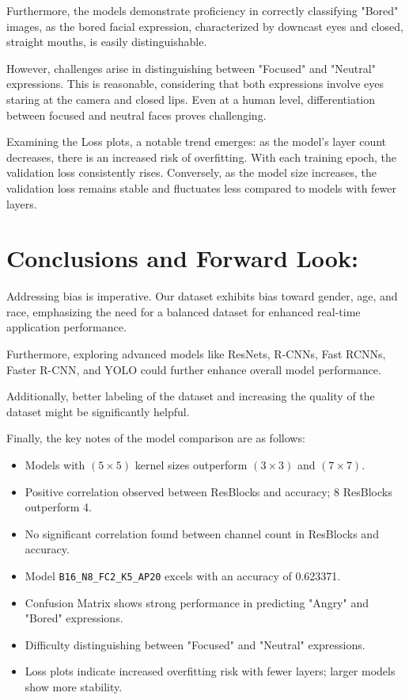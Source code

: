 Furthermore, the models demonstrate proficiency in correctly classifying "Bored" images, as the bored facial expression, characterized by downcast eyes and closed, straight mouths, is easily distinguishable.

However, challenges arise in distinguishing between "Focused" and "Neutral" expressions. This is reasonable, considering that both expressions involve eyes staring at the camera and closed lips. Even at a human level, differentiation between focused and neutral faces proves challenging.

Examining the Loss plots, a notable trend emerges: as the model's layer count decreases, there is an increased risk of overfitting. With each training epoch, the validation loss consistently rises. Conversely, as the model size increases, the validation loss remains stable and fluctuates less compared to models with fewer layers.


\section{Conclusions and Forward Look:}


Addressing bias is imperative. Our dataset exhibits bias toward gender, age, and race, emphasizing the need for a balanced dataset for enhanced real-time application performance.

Furthermore, exploring advanced models like ResNets, R-CNNs, Fast RCNNs, Faster R-CNN, and YOLO could further enhance overall model performance.


Additionally, better labeling of the dataset and increasing the quality of the dataset might be significantly helpful.

Finally, the key notes of the model comparison are as follows:

\begin{itemize}
	\item Models with $(5\times5)$ kernel sizes outperform $(3\times3)$ and $(7\times7)$.
	\item Positive correlation observed between ResBlocks and accuracy; 8 ResBlocks outperform 4.
	\item No significant correlation found between channel count in ResBlocks and accuracy.
	\item Model \texttt{B16\_N8\_FC2\_K5\_AP20} excels with an accuracy of 0.623371.
	\item Confusion Matrix shows strong performance in predicting "Angry" and "Bored" expressions.
	\item Difficulty distinguishing between "Focused" and "Neutral" expressions.
	\item Loss plots indicate increased overfitting risk with fewer layers; larger models show more stability.
\end{itemize}


